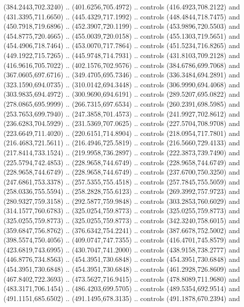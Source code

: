 \begin{scope}[shift={(-162.56685,-567.58888)}]
\begin{scope}
      (384.2443,702.3240) .. (401.6256,705.4972) .. controls (416.4923,708.2122) and
      (431.3395,711.6650) .. (445.4329,717.1992) .. controls (448.4844,718.7475) and
      (450.7918,719.6896) .. (452.3907,720.1199) .. controls (453.9896,720.5503) and
      (454.8775,720.4665) .. (455.0039,720.0158) .. controls (455.1303,719.5651) and
      (454.4906,718.7464) .. (453.0070,717.7864) .. controls (451.5234,716.8265) and
      (449.1922,715.7265) .. (445.9748,714.7931) .. controls (431.8103,709.2128) and
      (416.9616,705.7022) .. (402.1576,702.9576) .. controls (384.6786,699.7068) and
      (367.0605,697.6716) .. (349.4705,695.7346) .. controls (336.3484,694.2891) and
      (323.1590,694.0735) .. (310.0142,694.3448) .. controls (306.9990,694.4068) and
      (303.9835,694.4972) .. (300.9690,694.6191) .. controls (289.5207,695.0822) and
      (278.0865,695.9999) .. (266.7315,697.6534) .. controls (260.2391,698.5985) and
      (253.7653,699.7940) .. (247.3858,701.4573) .. controls (241.9927,702.8612) and
      (236.6283,704.5929) .. (231.5369,707.0625) .. controls (227.5704,708.9708) and
      (223.6649,711.4020) .. (220.6151,714.8904) .. controls (218.0954,717.7801) and
      (216.4683,721.5611) .. (216.4946,725.5819) .. controls (216.5660,729.4133) and
      (217.8414,733.1524) .. (219.9958,736.2897) .. controls (222.3873,739.7490) and
      (225.5794,742.4853) .. (228.9658,744.6749) .. controls (228.9658,744.6749) and
      (228.9658,744.6749) .. (228.9658,744.6749) .. controls (237.6700,750.3250) and
      (247.6861,753.3378) .. (257.5355,755.4518) .. controls (257.7845,755.5059) and
      (258.0336,755.5594) .. (258.2828,755.6123) .. controls (269.3992,757.9723) and
      (280.9327,759.3158) .. (292.5877,759.9848) .. controls (303.2853,760.6029) and
      (314.1577,760.6783) .. (325.0254,759.8773) .. controls (325.0255,759.8773) and
      (325.0255,759.8773) .. (325.0255,759.8773) .. controls (342.3240,758.6015) and
      (359.6847,756.8762) .. (376.6342,754.2241) .. controls (387.6678,752.5002) and
      (398.5574,750.4056) .. (409.0747,747.7355) .. controls (416.4701,745.8579) and
      (423.6819,743.6995) .. (430.7047,741.2000) .. controls (438.9158,738.2777) and
      (446.8776,734.8563) .. (454.3951,730.6848) .. controls (454.3951,730.6848) and
      (454.3951,730.6848) .. (454.3951,730.6848) .. controls (461.2928,726.8609) and
      (467.8402,722.3693) .. (473.5627,716.9415) .. controls (478.8089,711.9680) and
      (483.3171,706.1454) .. (486.4203,699.5705) .. controls (489.5354,692.9514) and
      (491.1151,685.6502) .. (491.1495,678.3135) .. controls (491.1878,670.2394) and

\end{scope}
\end{scope}
